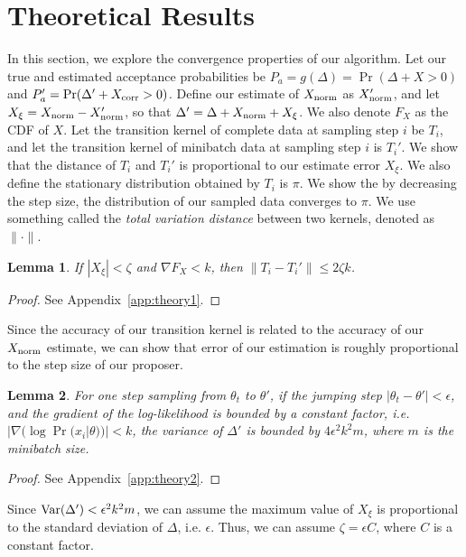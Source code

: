 \documentclass{article}
\newtheorem{lemma}{Lemma}
\begin{document}
\section{Theoretical Results}\label{sec:theory}

In this section, we explore the convergence properties of our algorithm. Let our true and estimated
acceptance probabilities be $P_a = g(\Delta) = \Pr(\Delta + X > 0)$ and $P_a' = \Pr(\Delta' + X_{\rm
corr} > 0)$. Define our estimate of $X_{\rm norm}$ as $X_{\rm norm}'$, and let $X_{\xi} = X_{\rm
norm} - X_{\rm norm}'$, so that $\Delta' = \Delta + X_{\rm norm} + X_\xi$.  We also denote $F_X$ as
the CDF of $X$.  Let the transition kernel of complete data at sampling step $i$ be $T_i$, and let
the transition kernel of minibatch data at sampling step $i$ is $T_i'$.  We show that the distance
of $T_i$ and $T_i'$ is proportional to our estimate error $X_{\xi}$. We also define the stationary
distribution obtained by $T_i$ is $\pi$.  We show the by decreasing the step size, the distribution
of our sampled data converges to $\pi$. We use something called the \emph{total variation distance}
between two kernels, denoted as $\| \cdot \|$.

\begin{lemma}\label{lem:theory1}
If $|X_\xi| < \zeta$ and $\nabla F_X < k$, then $\|T_i-T_i'\| \le 2\zeta k$.
\end{lemma}

\begin{proof}
See Appendix~\ref{app:theory1}.
\end{proof}

Since the accuracy of our transition kernel is related to the accuracy of our $X_{\rm norm}$
estimate, we can show that error of our estimation is roughly proportional to the step size of our
proposer.

\begin{lemma}\label{lem:theory2}
For one step sampling from $\theta_t$ to $\theta'$, if the jumping step  $|\theta_t - \theta'| <
\epsilon$, and the gradient of the log-likelihood is bounded by a constant factor, i.e. $|\nabla
(\log \Pr(x_i| \theta))| < k$, the variance of $\Delta'$ is bounded by $4\epsilon^2 k^2 m$, where
$m$ is the minibatch size.
\end{lemma}

\begin{proof}
See Appendix~\ref{app:theory2}.
\end{proof}

Since ${\rm Var}(\Delta') < \epsilon^2 k^2 m $, we can assume the maximum value of $X_{\xi}$ is
proportional to the standard deviation of $\Delta$, i.e. $\epsilon$. Thus, we can assume
$\zeta=\epsilon C$, where $C$ is a constant factor.
\end{document}
